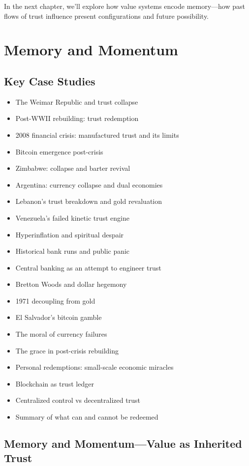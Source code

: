 \documentclass[11pt,oneside]{book}
\begin{document}
In the next chapter, we’ll explore how value systems encode memory—how past flows of trust influence present configurations and future possibility.


\chapter{ Memory and Momentum}

\section{Key Case Studies}

\begin{itemize}
\item The Weimar Republic and trust collapse
\item Post-WWII rebuilding: trust redemption
\item 2008 financial crisis: manufactured trust and its limits
\item Bitcoin emergence post-crisis
\item Zimbabwe: collapse and barter revival
\item Argentina: currency collapse and dual economies
\item Lebanon's trust breakdown and gold revaluation
\item Venezuela's failed kinetic trust engine
\item Hyperinflation and spiritual despair
\item Historical bank runs and public panic
\item Central banking as an attempt to engineer trust
\item Bretton Woods and dollar hegemony
\item 1971 decoupling from gold
\item El Salvador's bitcoin gamble
\item The moral of currency failures
\item The grace in post-crisis rebuilding
\item Personal redemptions: small-scale economic miracles
\item Blockchain as trust ledger
\item Centralized control vs decentralized trust
\item Summary of what can and cannot be redeemed
\end{itemize}

\section{Memory and Momentum—Value as Inherited Trust}
\end{document}
